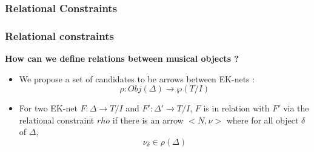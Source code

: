 \documentclass{beamer}
\begin{document}
\subsubsection{Relational Constraints}
\begin{frame}[fragile]
	\frametitle{Relational constraints}
	\textbf{How can we define relations between musical objects ?}
	\begin{itemize}
		\item We propose a set of candidates to be arrows between EK-nets  : $$\rho : Obj(\Delta) \rightarrow \wp(T/I)$$
		\item For two EK-net $F:\Delta\rightarrow T/I$ and $F':\Delta'\rightarrow T/I$, $F$ is in relation with $F'$ via the relational constraint $rho$ if there is an arrow $\big<N,\nu\big>$ where for all object $\delta$ of $\Delta$, $$\nu_\delta\in\rho(\Delta)$$
	\end{itemize}

	\begin{figure}
		\centering

		\label{fig:KAminor}
	\end{figure}

\end{frame}
\end{document}
